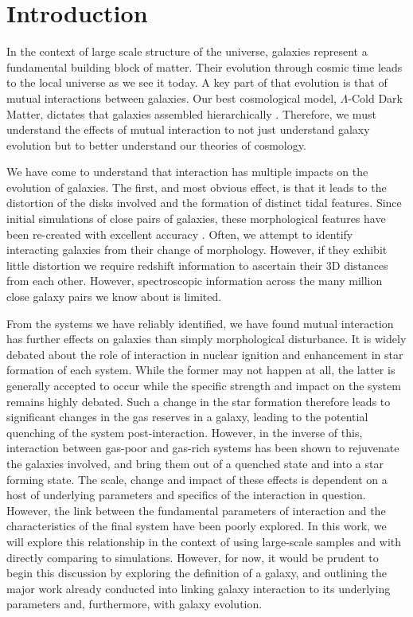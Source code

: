 \chapter{Introduction}
In the context of large scale structure of the universe, galaxies represent a fundamental building block of matter. Their evolution through cosmic time \citep{2005Natur.435..629S} leads to the local universe as we see it today. A key part of that evolution is that of mutual interactions between galaxies. Our best cosmological model, $\Lambda$-Cold Dark Matter, dictates that galaxies assembled hierarchically \citep{1978MNRAS.183..341W, 1991ApJ...379...52W}. Therefore, we must understand the effects of mutual interaction to not just understand galaxy evolution but to better understand our theories of cosmology.

We have come to understand that interaction has multiple impacts on the evolution of galaxies. The first, and most obvious effect, is that it leads to the distortion of the disks involved and the formation of distinct tidal features. Since initial simulations of close pairs of galaxies, these morphological features have been re-created with excellent accuracy \citep{1972ApJ...178..623T}. Often, we attempt to identify interacting galaxies from their change of morphology. However, if they exhibit little distortion we require redshift information to ascertain their 3D distances from each other. However, spectroscopic information across the many million close galaxy pairs we know about is limited.

From the systems we have reliably identified, we have found mutual interaction has further effects on galaxies than simply morphological disturbance. It is widely debated about the role of interaction in nuclear ignition and enhancement in star formation of each system. While the former may not happen at all, the latter is generally accepted to occur while the specific strength and impact on the system remains highly debated. Such a change in the star formation therefore leads to significant changes in the gas reserves in a galaxy, leading to the potential quenching of the system post-interaction. However, in the inverse of this, interaction between gas-poor and gas-rich systems has been shown to rejuvenate the galaxies involved, and bring them out of a quenched state and into a star forming state. The scale, change and impact of these effects is dependent on a host of underlying parameters and specifics of the interaction in question. However, the link between the fundamental parameters of interaction and the characteristics of the final system have been poorly explored. In this work, we will explore this relationship in the context of using large-scale samples and with directly comparing to simulations. However, for now, it would be prudent to begin this discussion by exploring the definition of  a galaxy, and outlining the major work already conducted into linking galaxy interaction to its underlying parameters and, furthermore, with galaxy evolution.

